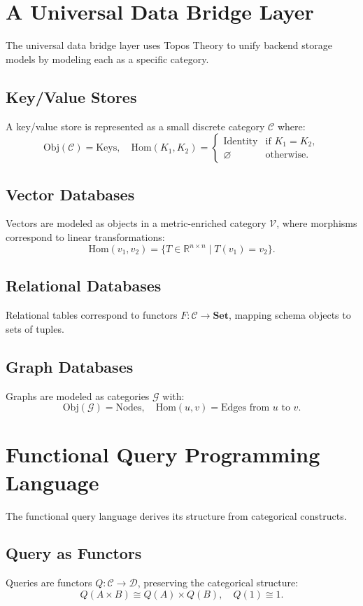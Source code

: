 \documentclass[12pt]{article}
\begin{document}
\section{A Universal Data Bridge Layer}

The universal data bridge layer uses Topos Theory to unify backend storage models by modeling each as a specific category.

\subsection{Key/Value Stores}
A key/value store is represented as a small discrete category $\mathcal{C}$ where:
\[
\mathrm{Obj}(\mathcal{C}) = \text{Keys}, \quad \mathrm{Hom}(K_1, K_2) = \begin{cases} 
\text{Identity} & \text{if } K_1 = K_2, \\
\varnothing & \text{otherwise.}
\end{cases}
\]

\subsection{Vector Databases}
Vectors are modeled as objects in a metric-enriched category $\mathcal{V}$, where morphisms correspond to linear transformations:
\[
\mathrm{Hom}(v_1, v_2) = \{ T \in \mathbb{R}^{n \times n} \mid T(v_1) = v_2 \}.
\]

\subsection{Relational Databases}
Relational tables correspond to functors $F: \mathcal{C} \to \mathbf{Set}$, mapping schema objects to sets of tuples.

\subsection{Graph Databases}
Graphs are modeled as categories $\mathcal{G}$ with:
\[
\mathrm{Obj}(\mathcal{G}) = \text{Nodes}, \quad \mathrm{Hom}(u, v) = \text{Edges from } u \text{ to } v.
\]

\section{Functional Query Programming Language}

The functional query language derives its structure from categorical constructs.

\subsection{Query as Functors}
Queries are functors $Q: \mathcal{C} \to \mathcal{D}$, preserving the categorical structure:
\[
Q(A \times B) \cong Q(A) \times Q(B), \quad Q(1) \cong 1.
\]
\end{document}
